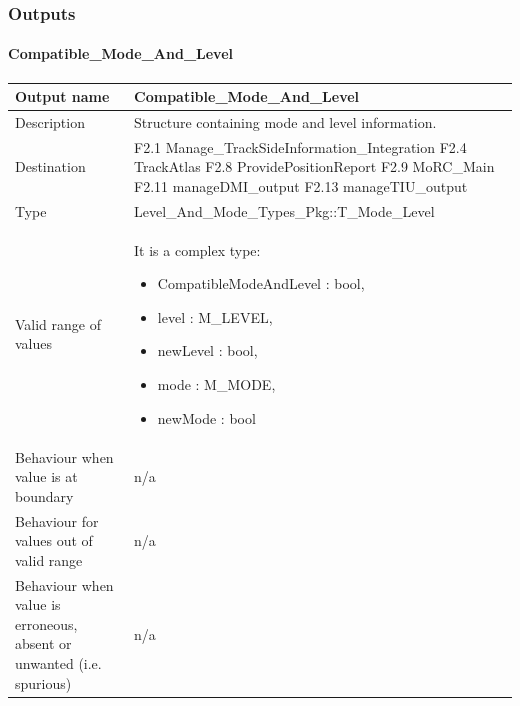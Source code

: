 \subsubsection{Outputs}\label{s:mode_and_level_outputs}




\paragraph{Compatible\_Mode\_And\_Level}

\begin{longtable}{p{}p{}}
\toprule
Output name				& Compatible\_Mode\_And\_Level \\
\midrule
Description				& Structure containing mode and level information.  \\
\midrule
Destination				& F2.1 Manage\_TrackSideInformation\_Integration\newline
F2.4 TrackAtlas\newline
F2.8 ProvidePositionReport\newline
F2.9 MoRC\_Main\newline
F2.11 manageDMI\_output\newline 
F2.13 manageTIU\_output \\ 
\midrule
Type					& Level\_And\_Mode\_Types\_Pkg::T\_Mode\_Level \\
\midrule
Valid range of values	& It is a complex type: 
\begin{itemize}
\item CompatibleModeAndLevel : bool,
\item level : M\_LEVEL,
\item newLevel : bool,
\item mode : M\_MODE, 
\item newMode : bool
\end{itemize} \\
\midrule
Behaviour when value is at boundary	& n/a \\ 
\midrule
Behaviour for values out of valid range	& n/a \\ 
\midrule
Behaviour when value is erroneous, absent or unwanted (i.e. spurious) & n/a \\
\bottomrule
\end{longtable}

